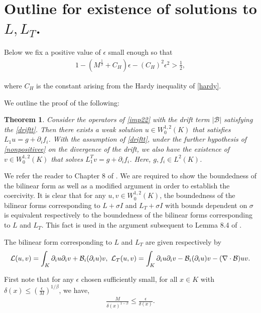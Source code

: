 \documentclass{article}
\theoremstyle{plain}
\newtheorem{theorem}{Theorem}
\theoremstyle{definition}
\theoremstyle{plain}
\newcommand{\eps}{\epsilon}
\newcommand{\B}{\mathcal{B}}
\begin{document}

\section{Outline for existence of solutions to $L, L_{T}$.}

Below we fix a positive value of $\eps$ small enough so that 
\begin{align}\label{eps}
    1-(M^{\frac{1}{\beta}}+C_H)\eps -(C_H)^{2} \eps^2 >\frac{1}{2},
\end{align}

where $C_H$ is the constant arising from the Hardy inequality of \cref{hardy}.

We outline the proof of the following: 

 \begin{theorem}\label{existence}
     Consider the operators of \cref{imp22} with the drift term $|\B|$ satisfying the \cref{driftt}. Then there exists a weak solution $u\in W^{1,2}_{0}(K)$ that satisfies $L_1 u=g+\partial_i f_i$. With the assumption of \cref{driftt}, under the further hypothesis of \cref{nonpositivee} on the divergence of the drift, we also have the existence of $v\in W^{1,2}_0(K)$ that solves $L^{T}_{1}v=g+\partial_i f_i$. Here, $g,f_i\in L^{2}(K)$.
 \end{theorem}

We refer the reader to Chapter 8 of \cite{Gt}. We are required to show the boundedness of the bilinear form as well as a modified argument in order to establish the coercivity. It is clear that for any $u, v \in W^{1,2}_0 (K)$, the boundedness of the bilinear forms corresponding to $L +\sigma I $ and $L_T  +\sigma I$ with bounds dependent on $\sigma$ is equivalent respectively to the boundedness of the bilinear forms corresponding to $L$ and $L_T$. This fact is used in the argument subsequent to Lemma 8.4 of \cite{Gt}.

The bilinear form corresponding to $L$ and $L_T$ are given respectively by 
\begin{equation}\label{forms}
    \mathcal{L}(u,v)=\int_{K} \partial_i u \partial_i v +\B_i (\partial_i u) v, \\
     \  \mathcal{L}_T(u,v)=\int_{K} \partial_i u \partial_i v - \B_i (\partial_i u) v -(\nabla\cdot \B)uv.
\end{equation}


First note that for any $\epsilon$ chosen sufficiently small, for all $x\in K$ with $\delta(x)\leq (\frac{\eps}{M})^{1/\beta}$, we have,
\begin{align*}
    \frac{M}{\delta(x)^{1-\beta}}\leq \frac{\eps}{\delta(x)}.
\end{align*}
\end{document}
